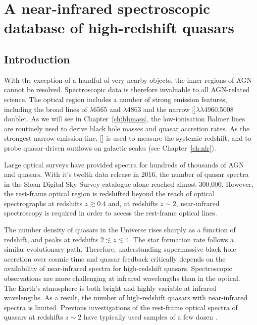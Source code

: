 
\chapter{A near-infrared spectroscopic database of high-redshift quasars}
\label{ch:nirsample}

\section{Introduction}

With the exception of a handful of very nearby objects, the inner regions of AGN cannot be resolved. 
Spectroscopic data is therefore invaluable to all AGN-related science. 
The optical region includes a number of strong emission features, including the broad lines of \hans$\lambda$6565 and \hbns$\lambda$4863 and the narrow []$\lambda\lambda$4960,5008 doublet. 
As we will see in Chapter~\ref{ch:bhmass}, the low-ionisation Balmer lines are routinely used to derive black hole masses and quasar accretion rates. 
As the strongest narrow emission line, [] is used to measure the systemic redshift, and to probe quasar-driven outflows on galactic scales (see Chapter~\ref{ch:nlr}). 

Large optical surveys have provided spectra for hundreds of thousands of AGN and quasars. 
With it's twelth data release in 2016, the number of quasar spectra in the Sloan Digital Sky Survey \citep[SDSS;][]{york00} catalogue alone reached almost 300,000. 
However, the rest-frame optical region is redshifted beyond the reach of optical spectrographs at redshifts $z \gtrsim0.4$ and, at redshifts $z\sim2$, near-infrared spectroscopy is required in order to access the rest-frame optical lines. 

The number density of quasars in the Universe rises sharply as a function of redshift, and peaks at redshifts $2\lesssim z \lesssim 4$. 
The star formation rate follows a similar evolutionary path. 
Therefore, understanding supermassive black hole accretion over cosmic time and quasar feedback critically depends on the availability of near-infrared spectra for high-redshift quasars. 
Spectroscopic observations are more challenging at infrared wavelengths than in the optical.
The Earth's atmosphere is both bright and highly variable at infrared wavelengths. 
As a result, the number of high-redshift quasars with near-infrared spectra is limited. 
Previous investigations of the rest-frame optical spectra of quasars at redshifts $z\sim2$ have typically used samples of a few dozen \citep[e.g.][]{shen12,shen16a}. 

